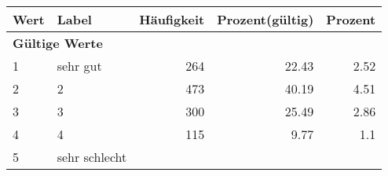      \begin{longtable}{lXrrr}
     \toprule
     \textbf{Wert} & \textbf{Label} & \textbf{Häufigkeit} & \textbf{Prozent(gültig)} & \textbf{Prozent} \\
     \endhead
     \midrule
     \multicolumn{5}{l}{\textbf{Gültige Werte}}\\

     1 &
     \multicolumn{1}{X}{ sehr gut   } &


       \num{264} &
       \num[round-mode=places,round-precision=2]{22,43} &
         \num[round-mode=places,round-precision=2]{2,52} \\

     2 &
     \multicolumn{1}{X}{ 2   } &


       \num{473} &
       \num[round-mode=places,round-precision=2]{40,19} &
         \num[round-mode=places,round-precision=2]{4,51} \\

     3 &
     \multicolumn{1}{X}{ 3   } &


       \num{300} &
       \num[round-mode=places,round-precision=2]{25,49} &
         \num[round-mode=places,round-precision=2]{2,86} \\

     4 &
     \multicolumn{1}{X}{ 4   } &


       \num{115} &
       \num[round-mode=places,round-precision=2]{9,77} &
         \num[round-mode=places,round-precision=2]{1,1} \\

     5 &
     \multicolumn{1}{X}{ sehr schlecht   } &



\end{longtable}
